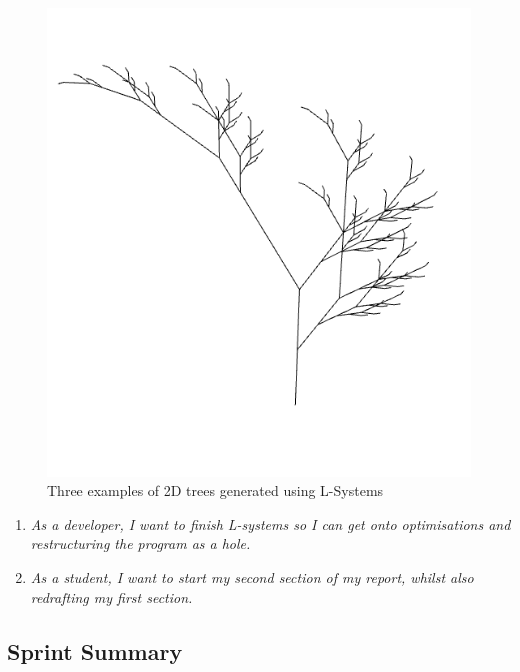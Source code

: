 \documentclass[a4paper,10pt]{report}
\begin{document}
\begin{figure}[h!]
\begin{minipage}{.3\textwidth}
\end{minipage}
\begin{minipage}{.3\textwidth}
  \centering
  \includegraphics[width=.9\linewidth]{Images/Sprint-Images/tree3.png}
\end{minipage}
\caption{Three examples of 2D trees generated using L-Systems}
 \label{fig:sprint8}

\end{figure}
\begin{enumerate}
\subsection{Sprint Goals}

\item \textit{As a developer, I want to finish L-systems so I can get onto optimisations and restructuring the program as a hole.}

\item \textit{As a student, I want to start my second section of my report, whilst also redrafting my first section.}
\end{enumerate}

\subsection{Sprint Summary}
\end{document}
